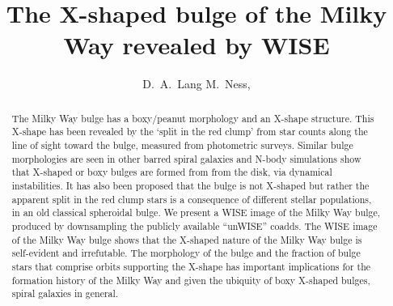\documentclass[12pt, preprint]{aastex}
\begin{document}
\title{The X-shaped bulge of the Milky Way revealed by WISE} 
\author{%
D.~A.~Lang
M.~Ness,
}
%
\begin{abstract}%
The Milky Way bulge has a boxy/peanut morphology and an X-shape structure. This X-shape has been revealed by the `split in the red clump' from 
star counts along the line of sight toward the bulge, measured from photometric surveys. Similar bulge morphologies are seen in other barred spiral galaxies and N-body simulations show that X-shaped or boxy bulges are formed from from the disk, via dynamical instabilities.  It has also been proposed that the bulge is not X-shaped but rather the apparent split in the red clump stars is a consequence of different stellar populations, in an old classical spheroidal bulge. We present a WISE image of the Milky Way bulge, produced by downsampling the publicly available ``unWISE'' coadds. The WISE image of the Milky Way bulge shows that the X-shaped nature of the Milky Way bulge is self-evident and irrefutable. The morphology of the bulge and the fraction of bulge stars that comprise orbits supporting the X-shape has important implications for the formation history of the Milky Way and given the ubiquity of boxy X-shaped bulges, spiral galaxies in general. 
\end{abstract}


\end{document}
